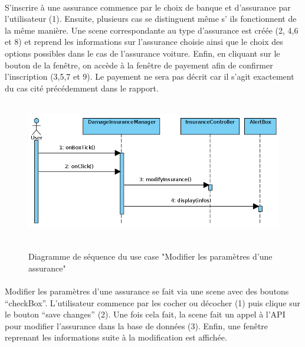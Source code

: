 \documentclass[]{article}
\begin{document}
\paragraph{}S’inscrire à une assurance commence par le choix de banque et d’assurance par l’utilisateur (1). Ensuite, plusieurs cas se distinguent même s' ils fonctionnent de la même manière. Une scene correspondante au type d’assurance est créée (2, 4,6 et 8) et reprend les informations sur l’assurance choisie ainsi que le choix des options possibles dans le cas de l’assurance voiture. Enfin, en cliquant sur le bouton de la fenêtre, on accède à la fenêtre de payement afin de confirmer l’inscription (3,5,7 et 9). Le payement ne sera pas décrit car il s’agit exactement du cas cité précédemment dans le rapport.

\newpage

\begin{figure}[h!]
    \hbox{
        \centering\includegraphics[width=\linewidth]{img/Modifier les paramètres d'une assurance.png}
    }
    \caption{Diagramme de séquence du use case "Modifier les paramètres d'une assurance"}
    \end{figure}

\paragraph{}Modifier les paramètres d’une assurance se fait via une scene avec des boutons “checkBox”. L’utilisateur commence par les cocher ou décocher (1) puis clique sur le bouton “save changes” (2). Une fois cela fait, la scene fait un appel à l’API pour modifier l’assurance dans la base de données (3). Enfin, une fenêtre reprenant les informations suite à la modification est affichée.

\newpage
\end{document}
